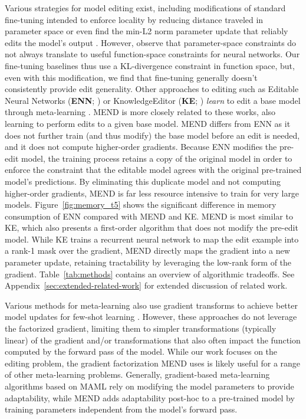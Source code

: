 \documentclass{article}
\newcommand{\name}{MEND}
\begin{document}


Various strategies for model editing exist, including modifications of standard fine-tuning intended to enforce locality by reducing distance traveled in parameter space \citep{zhu2020modifying} or even find the min-L2 norm parameter update that reliably edits the model's output \citep{Sotoudeh2021ProvableRO}. However, \citet{Cao2021EditingFK} observe that parameter-space constraints do not always translate to useful function-space constraints for neural networks. Our fine-tuning baselines thus use a KL-divergence constraint in function space, but, even with this modification, we find that fine-tuning generally doesn't consistently provide edit generality. Other approaches to editing such as Editable Neural Networks (\textbf{ENN}; \citet{Sinitsin2020Editable}) or KnowledgeEditor (\textbf{KE}; \citet{Cao2021EditingFK}) \textit{learn} to edit a base model through meta-learning \citep{finn2017maml,ha2017hyper}. {\name} is more closely related to these works, also learning to perform edits to a given base model. {\name} differs from ENN as it does not further train (and thus modify) the base model before an edit is needed, and it does not compute higher-order gradients. Because ENN modifies the pre-edit model, the training process retains a copy of the original model in order to enforce the constraint that the editable model agrees with the original pre-trained model's predictions. By eliminating this duplicate model and not computing higher-order gradients, {\name} is far less resource intensive to train for very large models. Figure~\ref{fig:memory_t5} shows the significant difference in memory consumption of ENN compared with {\name} and KE\@. {\name} is most similar to KE, which also presents a first-order algorithm that does not modify the pre-edit model. While KE trains a recurrent neural network to map the edit example into a rank-1 mask over the gradient, {\name} directly maps the gradient into a new parameter update, retaining tractability by leveraging the low-rank form of the gradient. Table~\ref{tab:methods} contains an overview of algorithmic tradeoffs. See Appendix~\ref{sec:extended-related-work} for extended discussion of related work.

Various methods for meta-learning also use gradient transforms to achieve better model updates for few-shot learning \citep{Ravi2017OptimizationAA,li2017metasgd,lee2018gradient,park2019meta,Flennerhag2020Meta-Learning}. However, these approaches do not leverage the factorized gradient, limiting them to simpler transformations (typically linear) of the gradient and/or transformations that also often impact the function computed by the forward pass of the model. While our work focuses on the editing problem, the gradient factorization {\name} uses is likely useful for a range of other meta-learning problems. Generally, gradient-based meta-learning algorithms based on MAML \citep{finn2017maml,lee2018gradient,park2019meta,Flennerhag2020Meta-Learning} rely on modifying the model parameters to provide adaptability, while {\name} adds adaptability post-hoc to a pre-trained model by training parameters independent from the model's forward pass.
\end{document}
